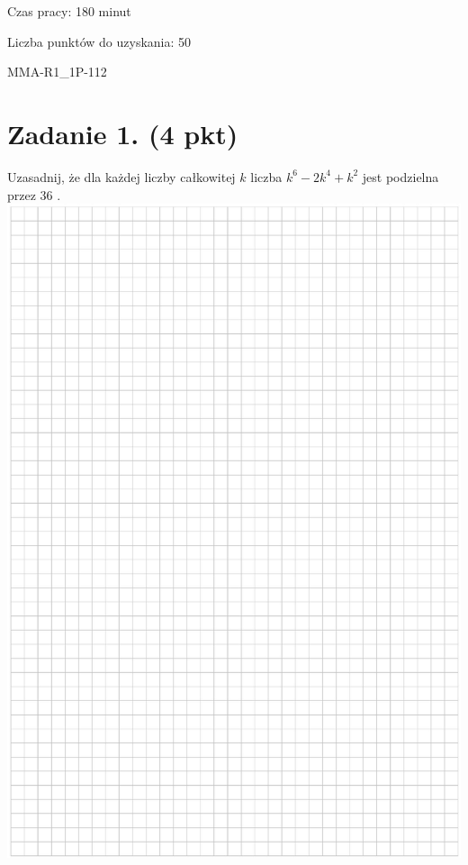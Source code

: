 \documentclass[10pt]{article}
\begin{document}
Czas pracy: 180 minut

Liczba punktów do uzyskania: 50

MMA-R1\_1P-112

\section*{Zadanie 1. (4 pkt)}
Uzasadnij, że dla każdej liczby całkowitej \(k\) liczba \(k^{6}-2 k^{4}+k^{2}\) jest podzielna przez 36 .\\
\includegraphics[max width=\textwidth, center]{2024_11_21_b36d8cbb94edb763da2cg-02}
\end{document}
